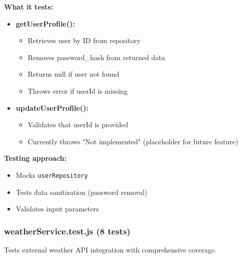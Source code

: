 \textbf{What it tests:}
\begin{itemize}
    \item \textbf{getUserProfile():}
    \begin{itemize}
        \item Retrieves user by ID from repository
        \item Removes password\_hash from returned data
        \item Returns null if user not found
        \item Throws error if userId is missing
    \end{itemize}
    
    \item \textbf{updateUserProfile():}
    \begin{itemize}
        \item Validates that userId is provided
        \item Currently throws "Not implemented" (placeholder for future feature)
    \end{itemize}
\end{itemize}

\textbf{Testing approach:}
\begin{itemize}
    \item Mocks \texttt{userRepository}
    \item Tests data sanitization (password removal)
    \item Validates input parameters
\end{itemize}

\subsubsection{weatherService.test.js (8 tests)}
\label{subsubsec:weather_service_test}

Tests external weather API integration with comprehensive coverage.

